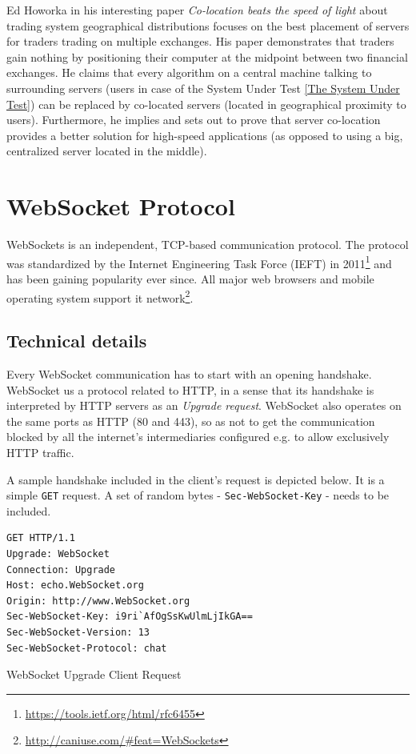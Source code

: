 \documentclass{uvamscse}
\begin{document}
Ed Howorka in his interesting paper \textit{Co-location beats the speed of light} \cite{EdHoColoc}  about trading system geographical distributions focuses on the best placement of servers for traders trading on multiple exchanges. His paper demonstrates that traders gain nothing by positioning their computer at the midpoint between two financial exchanges. He claims that  every algorithm on a central machine talking to surrounding servers (users in case of the System Under Test \ref{The System Under Test}) can be replaced by co-located servers (located in geographical proximity to users). Furthermore, he implies and sets out to prove that server co-location provides a better solution for high-speed applications (as opposed to using a big, centralized server located in the middle).


\section{WebSocket Protocol}\label{WebSocket Protocol}

WebSockets is an independent, TCP-based communication protocol. The protocol was standardized by the Internet Engineering Task Force (IEFT) in 2011\footnote{\url{https://tools.ietf.org/html/rfc6455}} and has been gaining popularity ever since. All major web browsers and mobile operating system support it network\footnote{\url{http://caniuse.com/\#feat=WebSockets}}.

\subsection{Technical details}

Every WebSocket communication has to start with an opening handshake. WebSocket us a protocol related to HTTP, in a sense that its handshake is interpreted by HTTP servers as an \textit{Upgrade request}. WebSocket also operates on the same ports as HTTP (80 and 443), so as not to get the communication blocked by all the internet's intermediaries configured e.g. to allow exclusively HTTP traffic.

A sample handshake included in the client's request is depicted below. It is a simple \texttt{GET} request. A set of random bytes - \texttt{Sec-WebSocket-Key} - needs to be included.

\begin{sourcecode}
\begin{lstlisting}[style=mono]
GET HTTP/1.1
Upgrade: WebSocket
Connection: Upgrade
Host: echo.WebSocket.org
Origin: http://www.WebSocket.org
Sec-WebSocket-Key: i9ri`AfOgSsKwUlmLjIkGA==
Sec-WebSocket-Version: 13
Sec-WebSocket-Protocol: chat
\end{lstlisting}
\caption{WebSocket Upgrade Client Request}
\end{sourcecode}
\end{document}
